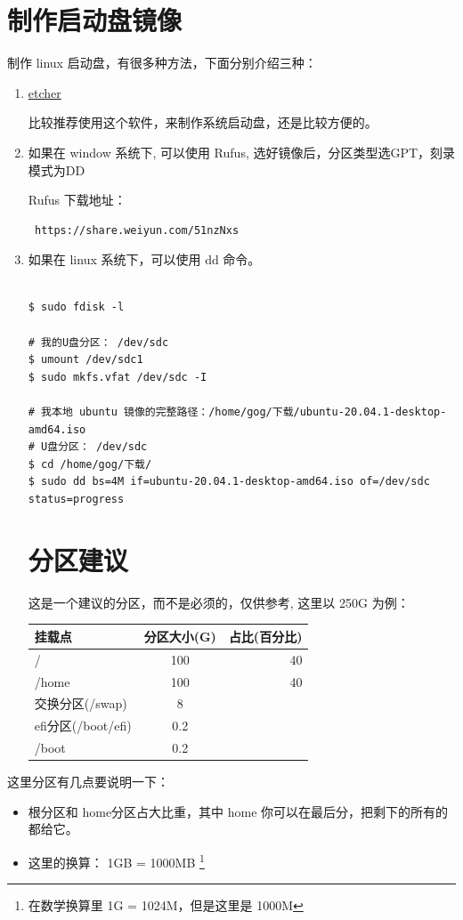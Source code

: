 \section{制作启动盘镜像}
制作 linux 启动盘，有很多种方法，下面分别介绍三种：
\flushleft
\begin{enumerate}

\item \href{https://www.balena.io/etcher/}{etcher}

比较推荐使用这个软件，来制作系统启动盘，还是比较方便的。

\item 如果在 window 系统下, 可以使用 Rufus, 选好镜像后，分区类型选GPT，刻录模式为DD

Rufus 下载地址：\\
\begin{lstlisting}
 https://share.weiyun.com/51nzNxs
\end{lstlisting}
\item 如果在 linux 系统下，可以使用 dd 命令。
\begin{lstlisting}

$ sudo fdisk -l 

# 我的U盘分区： /dev/sdc
$ umount /dev/sdc1
$ sudo mkfs.vfat /dev/sdc -I

# 我本地 ubuntu 镜像的完整路径：/home/gog/下载/ubuntu-20.04.1-desktop-amd64.iso 
# U盘分区： /dev/sdc
$ cd /home/gog/下载/
$ sudo dd bs=4M if=ubuntu-20.04.1-desktop-amd64.iso of=/dev/sdc status=progress
\end{lstlisting}

\section{分区建议}
这是一个建议的分区，而不是必须的，仅供参考, 这里以 250G 为例：


\begin{tabular}{|l|c|r|}
\hline
 挂载点 & 分区大小(G) & 占比(百分比)\\
\hline
   / & 100 & 40 \\      
\hline
   /home & 100 & 40 \\      
\hline
  交换分区(/swap) & 8 & \\
\hline
  efi分区(/boot/efi) & 0.2 & \\
\hline
  /boot & 0.2 & \\
\hline

\end{tabular}
\end{enumerate}


\setlength\parindent{2em}这里分区有几点要说明一下：

\begin{itemize}
\item 根分区和 home分区占大比重，其中 home 你可以在最后分，把剩下的所有的都给它。
\item 这里的换算： 1GB = 1000MB \footnote{在数学换算里 1G = 1024M，但是这里是 1000M}
\end{itemize}
